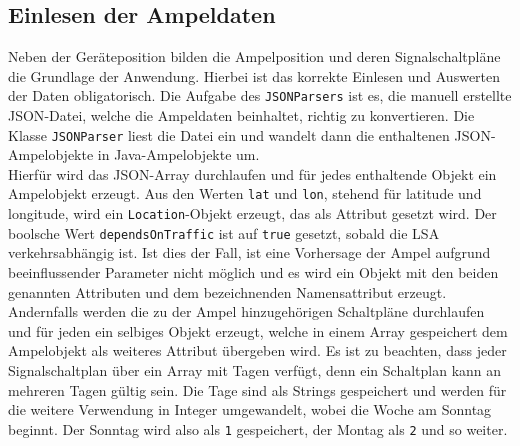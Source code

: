 \subsection{Einlesen der Ampeldaten}
Neben der Geräteposition bilden die Ampelposition und deren Signalschaltpläne die Grundlage der Anwendung. Hierbei ist das korrekte Einlesen und Auswerten der Daten obligatorisch. Die Aufgabe des \texttt{JSONParsers} ist es, die manuell erstellte \gls{JSON}-Datei, welche die Ampeldaten beinhaltet, richtig zu konvertieren. Die Klasse \texttt{JSONParser} liest die Datei ein und wandelt dann die enthaltenen \gls{JSON}-Ampelobjekte in Java-Ampelobjekte um.\\ 
Hierfür wird das \gls{JSON}-Array durchlaufen und für jedes enthaltende Objekt ein Ampelobjekt erzeugt. Aus den Werten \texttt{lat} und \texttt{lon}, stehend für latitude und longitude, wird ein \texttt{Location}-Objekt erzeugt, das als Attribut gesetzt wird. Der boolsche Wert \texttt{dependsOnTraffic} ist auf \texttt{true} gesetzt, sobald die \gls{LSA} verkehrsabhängig ist. Ist dies der Fall, ist eine Vorhersage der Ampel aufgrund beeinflussender Parameter nicht möglich und es wird ein Objekt mit den beiden genannten Attributen und dem bezeichnenden Namensattribut erzeugt. Andernfalls werden die zu der Ampel hinzugehörigen Schaltpläne durchlaufen und für jeden ein selbiges Objekt erzeugt, welche in einem Array gespeichert dem Ampelobjekt als weiteres Attribut übergeben wird. Es ist zu beachten, dass jeder Signalschaltplan über ein Array mit Tagen verfügt, denn ein Schaltplan kann an mehreren Tagen gültig sein. Die Tage sind als Strings gespeichert und werden für die weitere Verwendung in Integer umgewandelt, wobei die Woche am Sonntag beginnt. Der Sonntag wird also als \texttt{1} gespeichert, der Montag als \texttt{2} und so weiter. 
%
%
